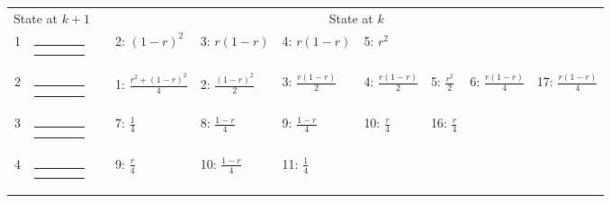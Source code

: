 \documentclass[9pt,letterpaper,twoside]{article}
\begin{document}
\bigskip

{
\begin{center}
\begin{tabular}{ccclllllll} \hline
\multicolumn{2}{c}{State at $k+1$} & &
\multicolumn{7}{c}{State at $k$} \\
\cline{1-2} \cline{4-10}
1 &
{\renewcommand{\arraystretch}{0.3}
\renewcommand{\tabcolsep}{0.5mm}
\parbox[b][3mm][c]{12mm}{
\begin{tabular}{|p{2mm}|p{2mm}||p{2mm}|p{2mm}|} \hline
$\bullet$ & $\bullet$ &           &           \\
$\bullet$ & $\circ  $ &           &           \\ \hline
\end{tabular}}}
&
& 2: $(1-r)^2$
& 3: $r(1-r)$
& 4: $r(1-r)$
& 5: $r^2$
& & & \\
2 &
{\renewcommand{\arraystretch}{0.3}
\renewcommand{\tabcolsep}{0.5mm}
\parbox[b][3mm][c]{12mm}{
\begin{tabular}{|p{2mm}|p{2mm}||p{2mm}|p{2mm}|} \hline
$\bullet$ &           & $\bullet$ &           \\
$\bullet$ &           & $\circ  $ &           \\ \hline
\end{tabular}}}
&
& 1: $\frac{r^2+(1-r)^2}{4}$
& 2: $\frac{(1-r)^2}{2}$
& 3: $\frac{r(1-r)}{2}$
& 4: $\frac{r(1-r)}{2}$
& 5: $\frac{r^2}{2}$
& 6: $\frac{r(1-r)}{4}$
& 17: $\frac{r(1-r)}{4}$
\\
3 &
{\renewcommand{\arraystretch}{0.3}
\renewcommand{\tabcolsep}{0.5mm}
\parbox[b][3mm][c]{12mm}{
\begin{tabular}{|p{2mm}|p{2mm}||p{2mm}|p{2mm}|} \hline
$\bullet$ &           & $\bullet$ &           \\
$\bullet$ &           &           & $\circ  $ \\ \hline
\end{tabular}}}
&
& 7: $\frac{1}{4}$
& 8: $\frac{1-r}{4}$
& 9: $\frac{1-r}{4}$
& 10: $\frac{r}{4}$
& 16: $\frac{r}{4}$
& & \\
4 &
{\renewcommand{\arraystretch}{0.3}
\renewcommand{\tabcolsep}{0.5mm}
\parbox[b][3mm][c]{12mm}{
\begin{tabular}{|p{2mm}|p{2mm}||p{2mm}|p{2mm}|} \hline
$\bullet$ &           & $\bullet$ &           \\
          & $\bullet$ & $\circ  $ &           \\ \hline
\end{tabular}}}
&
& 9: $\frac{r}{4}$
& 10: $\frac{1-r}{4}$
& 11: $\frac{1}{4}$

\end{tabular}
\end{center}}
\end{document}
